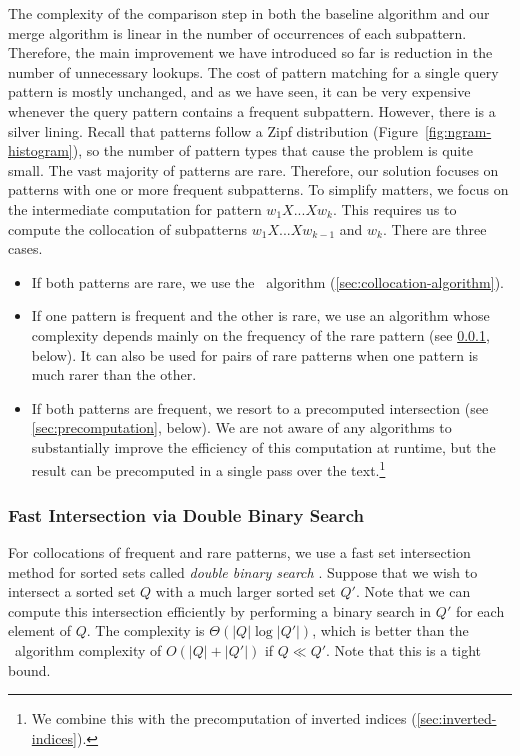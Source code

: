 The complexity of the comparison step in 
both the baseline algorithm and our merge algorithm is
linear in the number of occurrences of each subpattern.
Therefore, the main improvement we have introduced so far is
reduction in the number of unnecessary lookups.  The cost
of pattern matching for a single query pattern is mostly unchanged, and as
we have seen, it can be very expensive whenever
the query pattern contains a frequent subpattern.
However, there is a silver lining.
Recall that patterns follow a Zipf distribution 
(Figure~\ref{fig:ngram-histogram}), so
the number of pattern types that cause the problem
is quite small.  The vast majority of patterns
are rare.  Therefore, our solution focuses on patterns 
with one or more frequent subpatterns.  
To simplify matters, we focus on the intermediate computation
for pattern $w_1 X ... X w_k$.  This requires us
to compute the collocation of subpatterns $w_1 X ... X w_{k-1}$ 
and $w_{k}$.  There are three cases.

\begin{itemize}
	\item If both patterns are rare, we use the \queryfunc\ algorithm (\textsection\ref{sec:collocation-algorithm}).

	\item If one pattern is frequent and the other is rare, we
	use an algorithm whose complexity depends mainly on the 
	frequency of the rare pattern (see \textsection\ref{sec:double-binary}, below).  
	It can also be used for pairs of rare patterns when one 
	pattern is much rarer than the other.

	\item If both patterns are frequent, we resort to a precomputed
	intersection (see \textsection\ref{sec:precomputation}, below).  We are
	not aware of any algorithms to substantially improve the efficiency
	of this computation at runtime, but the result can be precomputed
	in a single pass over the text.\footnote{We combine this with the
	precomputation of inverted indices (\textsection\ref{sec:inverted-indices}).}
\end{itemize}

\subsubsection{Fast Intersection via Double Binary Search}\label{sec:double-binary}

For collocations of frequent and rare patterns, 
we use a fast set intersection method for sorted
sets called {\em double binary search}
\citep{Baeza-Yates:2004:cpm}.  Suppose that we
wish to intersect a sorted set $Q$ with a much larger
sorted set $Q'$.  Note that we can compute this 
intersection efficiently by performing a binary 
search in $Q'$ for each element of $Q$.  The
complexity is $\Theta(|Q| \log |Q'|)$, which
is better than the \intersectfunc\ algorithm complexity
of $O(|Q| + |Q'|)$ if $Q \ll Q'$.  Note
that this is a tight bound.

